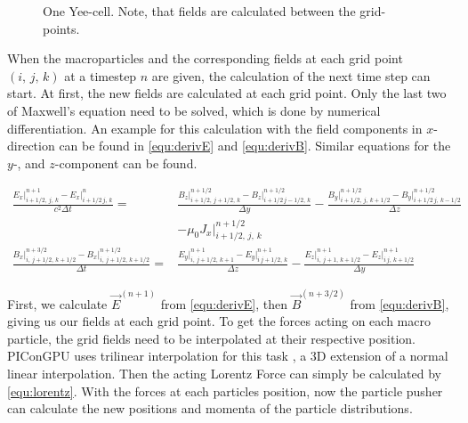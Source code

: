 \documentclass[bachelor_thesis]{subfiles}
\begin{document}
\begin{figure}
	\centering
	\missingfigure{}
	\caption{One Yee-cell. Note, that fields are calculated between the grid-points.}
	\label{fig:cell}
\end{figure}

When the macroparticles and the corresponding fields at each grid point $(i, \, j, \,k)$ at a timestep $n$ are given, the calculation of the next time step can start.
At first, the new fields are calculated at each grid point. Only the last two of Maxwell's equation need to be solved, which is done by numerical differentiation. 
An example for this calculation with the field components in $x$-direction can be found in \autoref{equ:derivE} and \autoref{equ:derivB}. Similar equations for the $y$-, and $z$-component can be found.

\begin{align}
	\frac{{E}_x\rvert_{i+1/2,\, j,\, k}^{n+1} - {E}_x\rvert_{i+1/2\, j,\, k}^{n}}{c^2\Delta t}
	=& \frac{{B}_z\rvert_{i+1/2,\, j+1/2,\, k}^{n+1/2} - {B}_z\rvert_{i+1/2\, j-1/2,\, k}^{n+1/2}}{\Delta y}
	- \frac{{B}_y\rvert_{i+1/2,\, j,\, k+1/2}^{n+1/2} - {B}_y\rvert_{i+1/2\, j,\, k-1/2}^{n+1/2}}{\Delta z}
	\label{equ:derivE}	\\&
	-\mu_0 J_x \rvert_{i+1/2,\, j,\, k}^{n+1/2}											\nonumber	\\
	 \frac{{B}_x\rvert_{i,\, j+1/2,\, k+1/2}^{n+3/2} - {B}_x\rvert_{i,\, j+1/2,\, k+1/2}^{n+1/2}}{\Delta t} 
	 =& \frac{{E}_y\rvert_{i,\, j+1/2,\, k+1}^{n+1} - {E}_y\rvert_{i\, j+1/2,\, k}^{n+1}}{\Delta z}
	- \frac{{E}_z\rvert_{i,\, j+1,\, k+1/2}^{n+1} - {E}_z\rvert_{i\, j,\, k+1/2}^{n+1}}{\Delta y}
	\label{equ:derivB}
\end{align} 

First, we calculate $\vec{E}^{(n+1)}$ from \autoref{equ:derivE}, then $\vec{B}^{(n+3/2)}$ from \autoref{equ:derivB}, giving us our fields at each grid point.
To get the forces acting on each macro particle, the grid fields need to be interpolated at their respective position. PIConGPU uses trilinear interpolation for this task \cite{Huebl2019, PICRepo}, a 3D extension of a normal linear interpolation.
Then the acting Lorentz Force can simply be calculated by \autoref{equ:lorentz}. With the forces at each particles position, now the particle pusher can calculate the new positions and momenta of the particle distributions.
\end{document}
